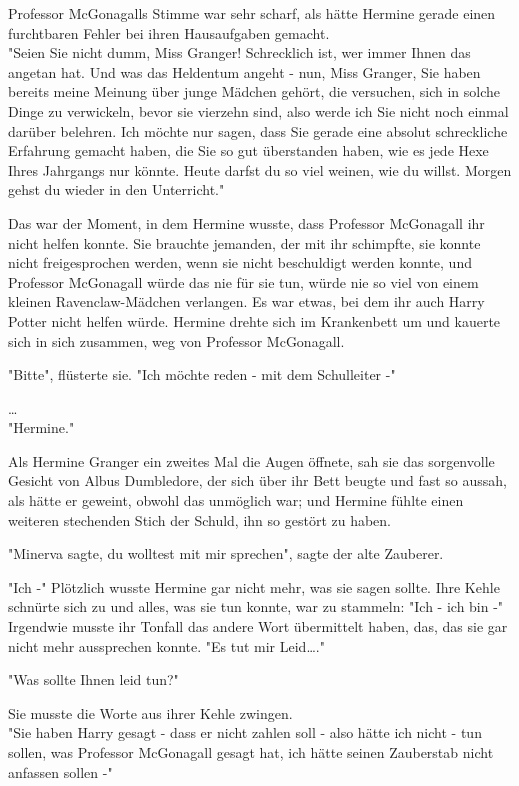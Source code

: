 {Professor McGonagalls Stimme war sehr scharf, als hätte Hermine gerade einen furchtbaren Fehler bei ihren Hausaufgaben gemacht.\\ "Seien Sie nicht dumm, Miss Granger! Schrecklich ist, wer immer Ihnen das angetan hat. Und was das Heldentum angeht - nun, Miss Granger, Sie haben bereits meine Meinung über junge Mädchen gehört, die versuchen, sich in solche Dinge zu verwickeln, bevor sie vierzehn sind, also werde ich Sie nicht noch einmal darüber belehren. Ich möchte nur sagen, dass Sie gerade eine absolut schreckliche Erfahrung gemacht haben, die Sie so gut überstanden haben, wie es jede Hexe Ihres Jahrgangs nur könnte. Heute darfst du so viel weinen, wie du willst. Morgen gehst du wieder in den Unterricht."

Das war der Moment, in dem Hermine wusste, dass Professor McGonagall ihr nicht helfen konnte. Sie brauchte jemanden, der mit ihr schimpfte, sie konnte nicht freigesprochen werden, wenn sie nicht beschuldigt werden konnte, und Professor McGonagall würde das nie für sie tun, würde nie so viel von einem kleinen Ravenclaw-Mädchen verlangen. Es war etwas, bei dem ihr auch Harry Potter nicht helfen würde. Hermine drehte sich im Krankenbett um und kauerte sich in sich zusammen, weg von Professor McGonagall.

"Bitte", flüsterte sie. "Ich möchte reden - mit dem Schulleiter -"

…\\ "Hermine."

Als Hermine Granger ein zweites Mal die Augen öffnete, sah sie das sorgenvolle Gesicht von Albus Dumbledore, der sich über ihr Bett beugte und fast so aussah, als hätte er geweint, obwohl das unmöglich war; und Hermine fühlte einen weiteren stechenden Stich der Schuld, ihn so gestört zu haben.

"Minerva sagte, du wolltest mit mir sprechen", sagte der alte Zauberer.

"Ich -" Plötzlich wusste Hermine gar nicht mehr, was sie sagen sollte. Ihre Kehle schnürte sich zu und alles, was sie tun konnte, war zu stammeln: "Ich - ich bin -" Irgendwie musste ihr Tonfall das andere Wort übermittelt haben, das, das sie gar nicht mehr aussprechen konnte. "Es tut mir Leid…."

"Was sollte Ihnen leid tun?"

Sie musste die Worte aus ihrer Kehle zwingen.\\ "Sie haben Harry gesagt - dass er nicht zahlen soll - also hätte ich nicht - tun sollen, was Professor McGonagall gesagt hat, ich hätte seinen Zauberstab nicht anfassen sollen -"

}
